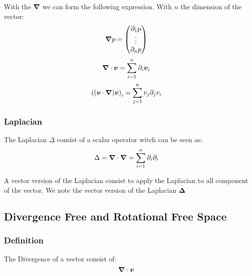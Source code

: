 With the ${\boldsymbol {\nabla}}$ we can form the following expression.
With $n$ the dimension of the vector:
\begin{equation}
 {\boldsymbol {\nabla}}p=\begin{pmatrix}\partial_1 p\\ \vdots \\ \partial_n p\end{pmatrix}
\end{equation}
\begin{equation}
 {\boldsymbol {\nabla}}\cdot {\boldsymbol {v}}=\sum_{i=1}^{n}\partial_i {\boldsymbol {v}}_i
\end{equation}
\begin{equation}
 \left(({\boldsymbol {v}}\cdot{\boldsymbol {\nabla}}){\boldsymbol {v}}\right)_{i}=\sum_{j=1}^{n}v_{j}\partial_{j} v_{i}
\end{equation}

\subsubsection{Laplacian}

\begin{definition}
The Laplacian $\Delta$ consist of a scalar operator witch can be seen as:
\begin{equation}
\Delta={\boldsymbol {\nabla}}\cdot {\boldsymbol {\nabla}}=\sum_{i=1}^{n} \partial_{i}\partial_{i}
\end{equation}
\end{definition}

\begin{definition}
A vector version of the Laplacian consist to apply the Laplacian to all component of the vector.
We note the vector version of the Laplacian ${\boldsymbol {\Delta}}$
\end{definition}
\subsection{Divergence Free and Rotational Free Space}

\subsubsection{Definition}

\begin{definition}
 The Divergence of a vector consist of:
 \begin{equation}
  {\boldsymbol {\nabla}} \cdot {\boldsymbol {v}}
  \end{equation}
\end{definition}

